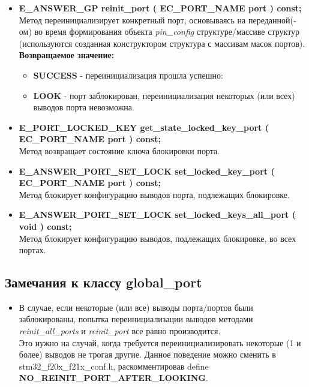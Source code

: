 \begin{itemize}
\begin{itemize}
	\end{itemize}
	\item \textbf{E\_ANSWER\_GP	reinit\_port	( EC\_PORT\_NAME port ) const;}\\Метод переинициализирует конкретный порт, основываясь на переданной(-ом) во время формирования объекта \textit{pin\_config} структуре/массиве структур (используются созданная конструктором структура с массивам масок портов).\\\textbf{Возвращаемое значение:}
	\begin{itemize}
		\item \textbf{SUCCESS} - переинициализация прошла успешно:	
		\item \textbf{LOOK} - порт заблокирован, переинициализация некоторых (или всех) выводов порта невозможна.
	\end{itemize}
	
	\item \textbf{E\_PORT\_LOCKED\_KEY	get\_state\_locked\_key\_port	( EC\_PORT\_NAME port ) const;}\\Метод возвращает состояние ключа блокировки порта.
	\item \textbf{E\_ANSWER\_PORT\_SET\_LOCK	set\_locked\_key\_port	( EC\_PORT\_NAME port ) const;}\\Метод блокирует конфигурацию выводов порта, подлежащих блокировке.
	\item \textbf{E\_ANSWER\_PORT\_SET\_LOCK	set\_locked\_keys\_all\_port	( void ) const; }\\Метод блокирует конфигурацию выводов, подлежащих блокировке, во всех портах.
\end{itemize}

\subsection{Замечания к классу global\_port}
\begin{itemize}
	\item В случае, если некоторые (или все) выводы порта/портов были заблокированы, попытка переинициализации выводов методами \textit{reinit\_all\_ports} и \textit{reinit\_port} все равно производится.\\Это нужно на случай, когда требуется переинициализировать некоторые (1 и более) выводов не трогая другие. Данное поведение можно сменить в stm32\_f20x\_f21x\_conf.h, раскомментировав define  \textbf{NO\_\-REINIT\_\-PORT\_\-AFTER\_\-LOOKING}.
\end{itemize}
